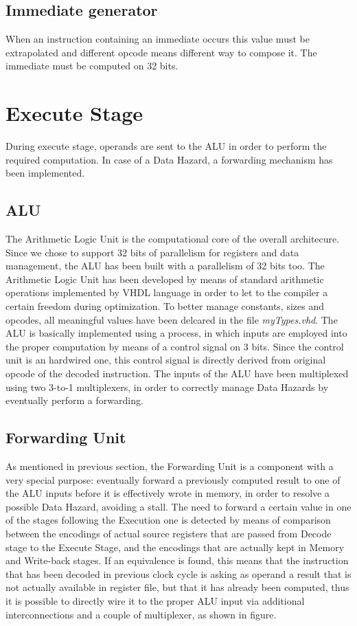 \subsection{Immediate generator}

When an instruction containing an immediate occurs this value must be extrapolated and different opcode 
means different way to compose it. The immediate must be computed on 32 bits.

\section{Execute Stage}

During execute stage, operands are sent to the ALU in order to perform the required computation. 
In case of a Data Hazard, a forwarding mechanism has been implemented.

\subsection{ALU}

The Arithmetic Logic Unit is the computational core of the overall architecure.
Since we chose to support 32 bits of parallelism for registers and data management, the ALU has been built with a parallelism of 32 bits too.
The Arithmetic Logic Unit has been developed by means of standard arithmetic operations implemented by VHDL language in order to let to the compiler a certain freedom during optimization.
To better manage constants, sizes and opcodes, all meaningful values have been delcared in the file \textit{myTypes.vhd}.
The ALU is basically implemented using a process, in which inputs are employed into the proper computation by means of a control signal on 3 bits.
Since the control unit is an hardwired one, this control signal is directly derived from original opcode of the decoded instruction.
The inputs of the ALU have been multiplexed using two 3-to-1 multiplexers, in order to correctly manage Data Hazards by eventually perform a forwarding.

\subsection{Forwarding Unit}

As mentioned in previous section, the Forwarding Unit is a component with a very special purpose: eventually forward a previously computed result to one of the ALU inputs before it is effectively wrote in memory, in order to resolve a possible Data Hazard, avoiding a stall.
The need to forward a certain value in one of the stages following the Execution one is detected by means of comparison between the encodings of actual source registers that are passed from Decode stage to the Execute Stage, and the encodings that are actually kept in Memory and Write-back stages.
If an equivalence is found, this means that the instruction that has been decoded in previous clock cycle is asking as operand a result that is not actually available in register file, but that it has already been computed, thus it is possible to directly wire it to the proper ALU input via additional interconnections and a couple of multiplexer, as shown in figure.  

